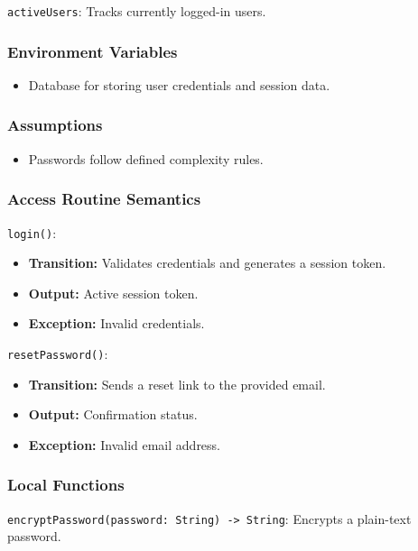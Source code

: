 \documentclass[12pt, titlepage]{article}
\begin{document}
\texttt{activeUsers}: Tracks currently logged-in users.

\subsubsection{Environment Variables}

\begin{itemize}
    \item Database for storing user credentials and session data.
\end{itemize}

\subsubsection{Assumptions}

\begin{itemize}
    \item Passwords follow defined complexity rules.
\end{itemize}

\subsubsection{Access Routine Semantics}

\noindent \texttt{login()}:
\begin{itemize}
    \item \textbf{Transition:} Validates credentials and generates a session token.
    \item \textbf{Output:} Active session token.
    \item \textbf{Exception:} Invalid credentials.
\end{itemize}

\noindent \texttt{resetPassword()}:
\begin{itemize}
    \item \textbf{Transition:} Sends a reset link to the provided email.
    \item \textbf{Output:} Confirmation status.
    \item \textbf{Exception:} Invalid email address.
\end{itemize}

\subsubsection{Local Functions}

\texttt{encryptPassword(password: String) -> String}: Encrypts a plain-text password.
\end{document}
